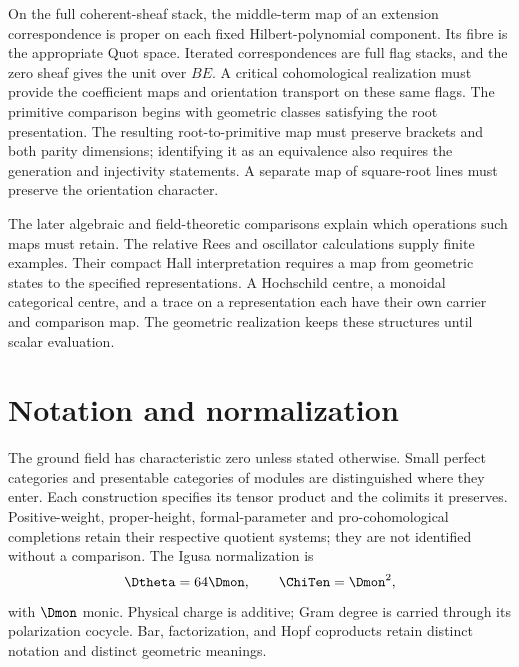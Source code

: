 \documentclass[11pt,twoside,openright]{memoir}
\begin{document}
On the full coherent-sheaf stack, the middle-term map of an extension
correspondence is proper on each fixed Hilbert-polynomial component.
Its fibre is the appropriate Quot space. Iterated correspondences
are full flag stacks, and the zero sheaf gives the unit over \(BE\).
A critical cohomological realization must provide the coefficient
maps and orientation transport on these same flags. The primitive comparison begins with geometric classes satisfying
the root presentation. The resulting root-to-primitive map must preserve
brackets and both parity dimensions; identifying it as an equivalence
also requires the generation and injectivity statements. A separate map
of square-root lines must preserve the orientation character.

The later algebraic and field-theoretic comparisons explain which
operations such maps must retain. The relative Rees and oscillator
calculations supply finite examples. Their compact Hall interpretation
requires a map from geometric states to the specified representations.
A Hochschild centre, a monoidal categorical centre, and a trace on a
representation each have their own carrier and comparison map.
The geometric realization keeps these structures until scalar evaluation.


\chapter*{Notation and normalization}
The ground field has characteristic zero unless stated otherwise. Small
perfect categories and presentable categories of modules are distinguished
where they enter. Each construction specifies its tensor product and the
colimits it preserves. Positive-weight, proper-height, formal-parameter
and pro-cohomological completions retain their respective quotient systems;
they are not identified without a comparison. The Igusa normalization is
\[
 \Dtheta=64\Dmon,\qquad \ChiTen=\Dmon^2,
\]
with $\Dmon$ monic.  Physical charge is additive; Gram degree is carried through its polarization cocycle.  Bar, factorization, and Hopf coproducts retain distinct notation and distinct geometric meanings.

\cleardoublepage
\tableofcontents
\mainmatter








\backmatter


\end{document}
